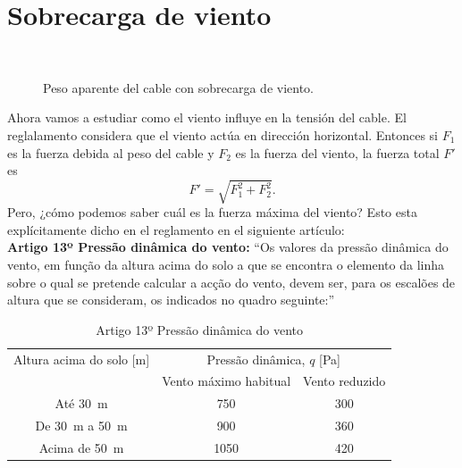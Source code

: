 \section{Sobrecarga de viento}
\begin{figure}
  \vspace{-1.2cm}
  \begin{figurebox}
    \centering
    \\
    \caption{Peso aparente del cable con sobrecarga de viento.}
    \label{fig:2}
  \end{figurebox}
  \vspace{-.8cm}
\end{figure}


Ahora vamos a estudiar como el viento influye en la tensión del cable. El
reglalamento considera que el viento actúa en dirección
horizontal. Entonces si $F_1$ es la fuerza debida al peso del cable y
$F_2$ es la fuerza del viento, la fuerza total $F'$ es
\begin{equation}
  \label{eq:2}
  F'=\sqrt{F_1^2+F_2^2}.
\end{equation}
Pero, ¿cómo podemos saber cuál es la fuerza máxima del viento? Esto esta
explícitamente dicho en el reglamento en el siguiente artículo:\\
{\bf Artigo 13º Pressão
  dinâmica do vento:} ``Os valores da pressão dinâmica do vento, em função da altura acima
do solo a que se encontra o elemento da linha sobre o qual se pretende
calcular a acção do vento, devem ser, para os escalões de altura que
se consideram, os indicados no quadro seguinte:''

\begin{table}[!h]
  \centering
  \begin{tabular}{ccc}
    \toprule
    Altura acima do solo [\si{m}] & 
    \multicolumn{2}{c}{Pressão dinâmica, $q$ [\si{Pa}]}\\
    \cmidrule(r){2-3}
    & Vento máximo habitual & Vento reduzido\\
    \midrule
    Até \SI{30}{m} & 750 & 300\\
    De \SI{30}{m} a \SI{50}{m} &  900 & 360\\
    Acima de \SI{50}{m} & 1050 & 420\\
    \bottomrule
  \end{tabular}
  \caption{Artigo 13º Pressão dinâmica do vento}
  \label{tab:3}
\end{table}

